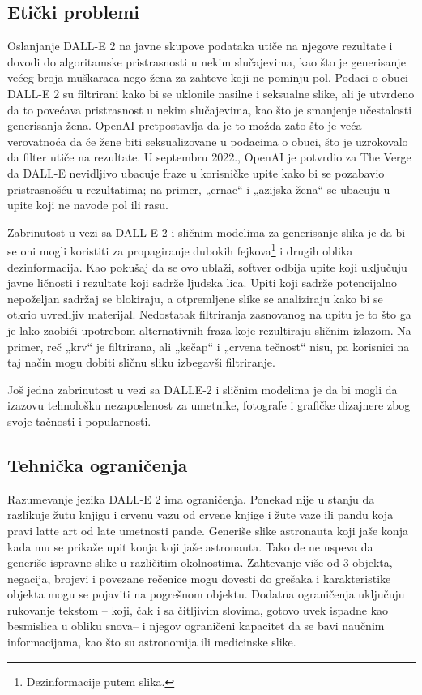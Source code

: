 \documentclass[a4paper]{article}
\begin{document}
\subsection{Etički problemi}
\label{subsec: Etički problemi}
Oslanjanje DALL-E 2 na javne skupove podataka utiče na njegove rezultate i dovodi do algoritamske pristrasnosti u nekim slučajevima, kao što je generisanje većeg broja muškaraca nego žena za zahteve koji ne pominju pol. Podaci o obuci DALL-E 2 su filtrirani kako bi se uklonile nasilne i seksualne slike, ali je utvrđeno da to povećava pristrasnost u nekim slučajevima, kao što je smanjenje učestalosti generisanja žena. OpenAI pretpostavlja da je to možda zato što je veća verovatnoća da će žene biti seksualizovane u podacima o obuci, što je uzrokovalo da filter utiče na rezultate. U septembru 2022., OpenAI je potvrdio za The Verge da DALL-E nevidljivo ubacuje fraze u korisničke upite kako bi se pozabavio pristrasnošću u rezultatima; na primer, „crnac“ i „azijska žena“ se ubacuju u upite koji ne navode pol ili rasu.

Zabrinutost u vezi sa DALL-E 2 i sličnim modelima za generisanje slika je da bi se oni mogli koristiti za propagiranje dubokih fejkova\footnote{Dezinformacije putem slika.} i drugih oblika dezinformacija. Kao pokušaj da se ovo ublaži, softver odbija upite koji uključuju javne ličnosti i rezultate koji sadrže ljudska lica. Upiti koji sadrže potencijalno nepoželjan sadržaj se blokiraju, a otpremljene slike se analiziraju kako bi se otkrio uvredljiv materijal. Nedostatak filtriranja zasnovanog na upitu je to što ga je lako zaobići upotrebom alternativnih fraza  koje rezultiraju sličnim izlazom. Na primer, reč „krv“ je filtrirana, ali „kečap“ i „crvena tečnost“ nisu, pa korisnici na taj način mogu dobiti sličnu sliku izbegavši filtriranje\cite{4}.

Još jedna zabrinutost u vezi sa DALLE-2 i sličnim modelima je da bi mogli da izazovu tehnološku  nezaposlenost za umetnike, fotografe i grafičke dizajnere zbog svoje tačnosti i popularnosti.
\subsection{Tehnička ograničenja}
\label{subsec: Tehnička ograničenja}
Razumevanje jezika DALL-E 2 ima ograničenja. Ponekad nije u stanju da razlikuje žutu knjigu i crvenu vazu od crvene knjige i žute vaze ili pandu koja pravi latte art od late umetnosti pande. Generiše slike astronauta koji jaše konja kada mu se prikaže upit konja koji jaše astronauta. Tako de ne uspeva da generiše ispravne slike u različitim okolnostima. Zahtevanje više od 3 objekta, negacija, brojevi i povezane rečenice mogu dovesti do grešaka i karakteristike objekta mogu se pojaviti na pogrešnom objektu. Dodatna ograničenja uključuju rukovanje tekstom – koji, čak i sa čitljivim slovima, gotovo uvek ispadne kao besmislica u obliku snova– i njegov ograničeni kapacitet da se bavi naučnim informacijama, kao što su astronomija ili medicinske slike.
\newpage
\end{document}
